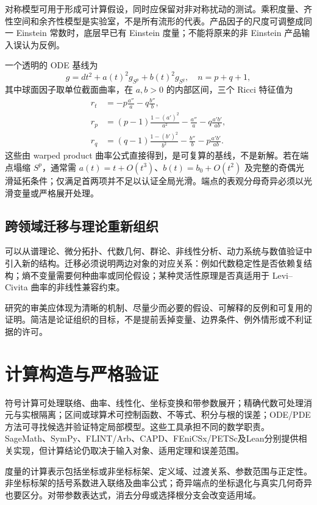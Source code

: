 \documentclass[11pt,a4paper]{article}
\theoremstyle{definition}
\begin{document}
对称模型可用于形成可计算假设，同时应保留对非对称扰动的测试。乘积度量、齐性空间和余齐性模型是实验室，不是所有流形的代表。产品因子的尺度可调整成同一 Einstein 常数时，底层早已有 Einstein 度量；不能将原来的非 Einstein 产品输入误认为反例。

一个透明的 ODE 基线为
\[
g=dt^2+a(t)^2g_{S^p}+b(t)^2g_{S^q},\quad n=p+q+1,
\]
其中球面因子取单位截面曲率，在 $a,b>0$ 的内部区间，三个 Ricci 特征值为
\begin{align*}
r_t&=-p\frac{a''}{a}-q\frac{b''}{b},\\
r_p&=(p-1)\frac{1-(a')^2}{a^2}-\frac{a''}{a}
-q\frac{a'b'}{ab},\\
r_q&=(q-1)\frac{1-(b')^2}{b^2}-\frac{b''}{b}
-p\frac{a'b'}{ab}.
\end{align*}
这些由 warped product 曲率公式直接得到，是可复算的基线，不是新解。若在端点塌缩 $S^p$，通常需 $a(t)=t+O(t^3)$、$b(t)=b_0+O(t^2)$ 及完整的奇偶光滑延拓条件；仅满足首两项并不足以认证全局光滑。端点的表观分母奇异必须以光滑变量或严格展开处理。

\subsection{跨领域迁移与理论重新组织}

可以从谱理论、微分拓扑、代数几何、群论、非线性分析、动力系统与数值验证中引入新的结构。迁移必须说明两边对象的对应关系：例如代数稳定性是否依赖复结构；熵不变量需要何种曲率或同伦假设；某种灵活性原理是否真适用于 Levi--Civita 曲率的非线性兼容约束。

研究的审美应体现为清晰的机制、尽量少而必要的假设、可解释的反例和可复用的证明。简洁是论证组织的目标，不是提前丢掉变量、边界条件、例外情形或不利证据的许可。

\section{计算构造与严格验证}\label{sec:engine}

符号计算可处理联络、曲率、线性化、坐标变换和带参数展开；精确代数可处理消元与实根隔离；区间或球算术可控制函数、不等式、积分与根的误差；ODE/PDE方法可寻找候选并验证特定局部模型。这些工具承担不同的数学职责。SageMath、SymPy、FLINT/Arb、CAPD、FEniCSx/PETSc及Lean分别提供相关实现，但计算结论仍取决于输入对象、适用定理和误差范围。

度量的计算表示包括坐标或非坐标标架、定义域、过渡关系、参数范围与正定性。非坐标标架的括号系数进入联络及曲率公式；奇异端点的坐标退化与真实几何奇异也要区分。对带参数表达式，消去分母或选择根分支会改变适用域。
\end{document}
